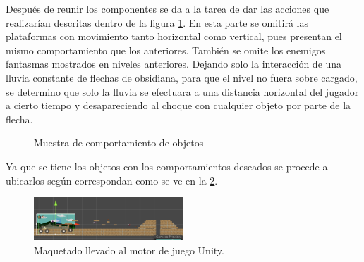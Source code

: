 Después de reunir los componentes se da a la tarea de dar las acciones que realizarían descritas dentro de la figura \ref{fig:n703}. En esta parte se omitirá las plataformas con movimiento tanto horizontal como vertical, pues presentan el mismo comportamiento que los anteriores. También se omite los enemigos fantasmas mostrados en niveles anteriores. Dejando solo la interacción de una lluvia constante de flechas de obsidiana, para que el nivel no fuera sobre cargado, se determino que solo la lluvia se efectuara a una distancia horizontal del jugador a cierto tiempo y desapareciendo al choque con cualquier objeto por parte de la flecha.
\begin{figure}[htbp]
	\centering
	\caption{Muestra de comportamiento de objetos} \label{fig:n703}
\end{figure}

Ya que se tiene los objetos con los comportamientos deseados se procede a ubicarlos según correspondan como se ve en la \ref{fig:n704}.
\begin{figure}
	\centering
	\caption{Maquetado llevado al motor de juego Unity.}
	\label{fig:n704}
	\includegraphics[width=0.5\textwidth]{03TrabajoRealizado/DocProduccionR/imagenes/n7/n701.png}
\end{figure}

